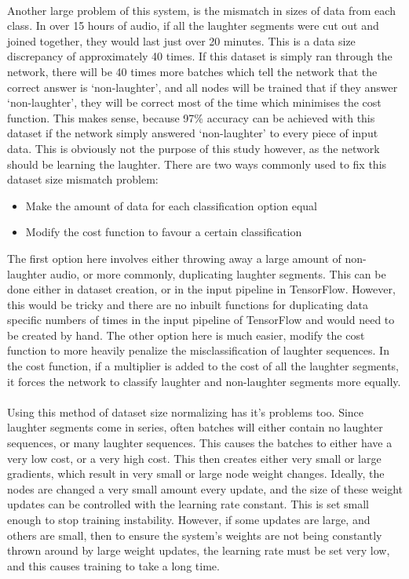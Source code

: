 \documentclass[a4paper,11pt,notitlepage]{article}
\begin{document}
\\
Another large problem of this system, is the mismatch in sizes of data from each class. In over 15 hours of audio, if all the laughter segments were cut out and joined together, they would last just over 20 minutes. This is a data size discrepancy of approximately 40 times. If this dataset is simply ran through the network, there will be 40 times more batches which tell the network that the correct answer is `non-laughter', and all nodes will be trained that if they answer `non-laughter', they will be correct most of the time which minimises the cost function. This makes sense, because 97\% accuracy can be achieved with this dataset if the network simply answered `non-laughter' to every piece of input data. This is obviously not the purpose of this study however, as the network should be learning the laughter. There are two ways commonly used to fix this dataset size mismatch problem:
\begin{itemize}
\item Make the amount of data for each classification option equal
\item Modify the cost function to favour a certain classification
\end{itemize}
The first option here involves either throwing away a large amount of non-laughter audio, or more commonly, duplicating laughter segments. This can be done either in dataset creation, or in the input pipeline in TensorFlow. However, this would be tricky and there are no inbuilt functions for duplicating data specific numbers of times in the input pipeline of TensorFlow and would need to be created by hand. The other option here is much easier, modify the cost function to more heavily penalize the misclassification of laughter sequences. In the cost function, if a multiplier is added to the cost of all the laughter segments, it forces the network to classify laughter and non-laughter segments more equally.\\
\\
Using this method of dataset size normalizing has it's problems too. Since laughter segments come in series, often batches will either contain no laughter sequences, or many laughter sequences. This causes the batches to either have a very low cost, or a very high cost. This then creates either very small or large gradients, which result in very small or large node weight changes. Ideally, the nodes are changed a very small amount every update, and the size of these weight updates can be controlled with the learning rate constant. This is set small enough to stop training instability. However, if some updates are large, and others are small, then to ensure the system's weights are not being constantly thrown around by large weight updates, the learning rate must be set very low, and this causes training to take a long time.
\end{document}
